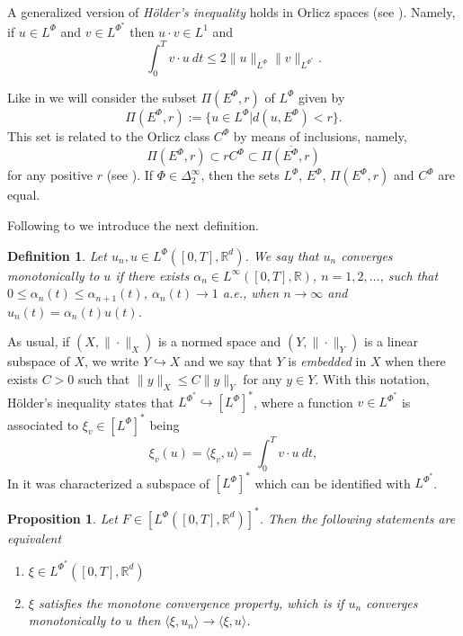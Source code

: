 \documentclass[twoside]{article}
\newtheorem{defi}[thm]{Definition}
\newtheorem{prop}[thm]{Proposition}
\theoremstyle{remark}
\newcommand{\orlnor}{\|_{L^{\Phi}}}
\newcommand{\lphi}{L^{\Phi}}
\newcommand{\lpsi}{L^{\Phi^*}}
\newcommand{\ephi}{E^{\Phi}}
\newcommand{\claseor}{C^{\Phi}}
\newcommand{\rr}{\mathbb{R}}
\renewcommand{\leq}{\leqslant}
\newcommand{\Phie}{\Phi^{*}}
\begin{document}
A generalized version of \emph{H\"older's inequality} holds in Orlicz spaces (see \cite[Thm. 4.1]{Skaff1969}). Namely, if $u\in\lphi$ and $v\in\lpsi$ then $u\cdot v\in L^1$ and
\begin{equation}\label{holder}
\int_0^Tv\cdot u\ dt\leq 2 \|u\orlnor\|v\|_{L^{\Phie}}.
\end{equation}


Like in \cite{KR} we will consider the subset $\Pi(\ephi,r)$ of $\lphi$ given by
\[\Pi(\ephi,r):=\{u\in\lphi| d(u,\ephi)<r\}.\]
This set is related to the Orlicz class $\claseor$ by means of inclusions, namely,
\begin{equation}\label{inclusiones}\Pi(\ephi, r )\subset r \claseor\subset\overline{\Pi(\ephi,r)}
\end{equation}
for any positive $r$ (see \cite[Thm. 5.6]{Orliczvectorial2005}).
If $\Phi \in \Delta_2^{\infty}$,  then the sets $\lphi$, $\ephi$, $\Pi(\ephi,r)$ and $\claseor$ are equal.

Following to \cite{Desch2001} we introduce the next definition.

\begin{defi} Let $u_n,u\in\lphi([0,T],\rr^d)$. We say that $u_n$ converges monotonically to $u$ if there exists $\alpha_n\in L^{\infty}([0,T],\rr)$, $n=1,2,\ldots$, such that $0\leq \alpha_n(t)\leq \alpha_{n+1}(t)$, $\alpha_n(t)\to 1$ a.e., when $n\to\infty$ and $u_n(t)=\alpha_n(t)u(t)$.

\end{defi}

 
As usual, if $(X,\|\cdot\|_X)$ is a normed space and $(Y,\|\cdot \|_Y)$ is a linear subspace of $X$,  we write $Y\hookrightarrow X$ and we say that $Y$ is \emph{embedded} in $X$  when there exists $C>0$ such that
$\|y\|_X\leq C\|y\|_Y$ for any $y\in Y$.  With this notation, H\"older's inequality states that  $\lpsi\hookrightarrow  \left[\lphi\right]^*$, where a function $v\in\lpsi$ is associated  to $\xi_v\in \left[\lphi\right]^*$ being
\begin{equation}\label{pairing}
  \xi_v(u)=\langle \xi_v,u\rangle=\int_0^Tv\cdot u\ dt,
\end{equation}
 In  \cite[Thm 2.9]{Desch2001}  it was characterized a subspace of   $\left[\lphi\right]^*$ which can be identified with $\lpsi$.

 \begin{prop} Let $F\in\left[\lphi([0,T],\rr^d)\right]^*$. Then the following statements are equivalent
 \begin{enumerate}
  \item $\xi\in \lpsi([0,T],\rr^d)$
  \item $\xi$ satisfies the \emph{monotone convergence property}, which is if $u_n$ converges monotonically to $u$ then $\langle \xi,u_n\rangle\to \langle \xi,u\rangle$.
 \end{enumerate}
 \end{prop}
\end{document}
